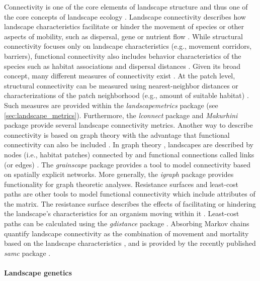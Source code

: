 \documentclass[smallextended]{svjour3}       %
\begin{document}
Connectivity is one of the core elements of landscape structure \cite{Taylor1993} and thus one of the core concepts of landscape ecology \cite{With2019}.
Landscape connectivity describes how landscape characteristics facilitate or hinder the movement of species \cite{Tischendorf2000} or other aspects of mobility, such as dispersal, gene or nutrient flow \cite{With2019}.
While structural connectivity focuses only on landscape characteristics (e.g., movement corridors, barriers), functional connectivity also includes behavior characteristics of the species such as habitat associations and dispersal distances \cite{Tischendorf2000,With2019}.
Given its broad concept, many different measures of connectivity exist \cite{Kindlmann2008}.
At the patch level, structural connectivity can be measured using nearest-neighbor distances or characterizations of the patch neighborhood (e.g., amount of suitable habitat) \cite{Kindlmann2008,With2019}.
Such measures are provided within the \emph{landscapemetrics} package (see \ref{sec:landscape_metrics}).
Furthermore, the \emph{lconnect} package \cite{Mestre2019} and \emph{Makurhini} package \cite{Godinez-Gomez2020} provide several landscape connectivity metrics.
Another way to describe connectivity is based on graph theory with the advantage that functional connectivity can also be included \cite{Kindlmann2008}.
In graph theory \cite{Laita2011}, landscapes are described by nodes (i.e., habitat patches) connected by and functional connections called links (or edges) \cite{Laita2011}.
The \emph{grainscape} package \cite{Chubaty2020} provides a tool to model connectivity based on spatially explicit networks.
More generally, the \emph{igraph} package \cite{Csardi2006} provides functionality for graph theoretic analyses.
Resistance surfaces and least-cost paths are other tools to model functional connectivity which include attributes of the matrix.
The resistance surface describes the effects of facilitating or hindering the landscape's characteristics for an organism moving within it \cite{Adriaensen2003}.
Least-cost paths can be calculated using the \emph{gdistance} package \cite{vanEtten2017}.
Absorbing Markov chains quantify landscape connectivity as the combination of movement and mortality based on the landscape characteristics \cite{Fletcher2019a}, and is provided by the recently published \emph{samc} package \cite{Marx2020}.

\hypertarget{sec:landscape_genetics}{%
\paragraph{Landscape genetics}\label{sec:landscape_genetics}}
\end{document}
